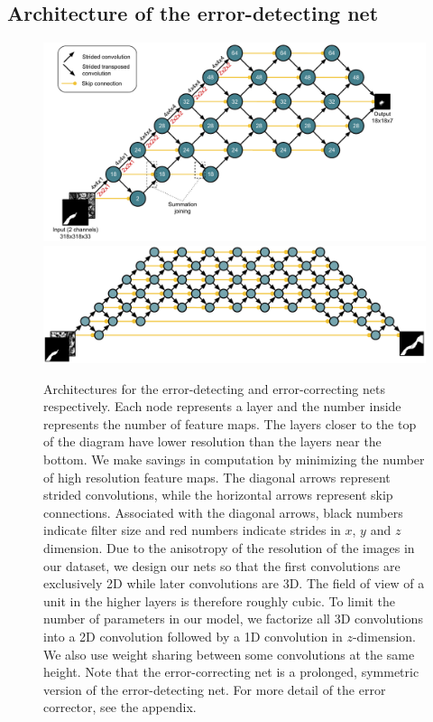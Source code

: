 \documentclass{article}
\begin{document}
\subsection{Architecture of the error-detecting net}
\begin{figure}
\centering
\includegraphics[width=0.9\linewidth]{detector.pdf}
\centering
\includegraphics[width=0.9\linewidth]{corrector2.pdf}

\caption{Architectures for the error-detecting and error-correcting nets
respectively. Each node represents a layer and the number inside represents the
number of feature maps. The layers closer to the top of the diagram have lower
resolution than the layers near the bottom. We make savings in computation by
minimizing the number of high resolution feature maps. The diagonal arrows
represent strided convolutions, while the horizontal arrows represent skip
connections. Associated with the diagonal arrows, black numbers indicate filter
size and red numbers indicate strides in $x$, $y$ and $z$ dimension. Due to the
anisotropy of the resolution of the images in our dataset, we design our nets so
that the first convolutions are exclusively 2D while later convolutions are 3D.
The field of view of a unit in the higher layers is therefore roughly cubic. To
limit the number of parameters in our model, we factorize all 3D convolutions
into a 2D convolution followed by a 1D convolution in $z$-dimension. We also use
weight sharing between some convolutions at the same height. Note that the
error-correcting net is a prolonged, symmetric version of the error-detecting
net. For more detail of the error corrector, see the appendix.}

\label{fig:architecture}
\end{figure}
\end{document}
